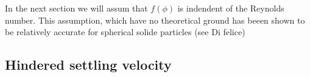 In the next section we will assum that $f(\phi)$ is indendent of the Reynolds number. This assumption, which have no theoretical ground has beeen shown to be relatively accurate for spherical solide particles (see Di felice)



\subsection{Hindered settling velocity}

 




